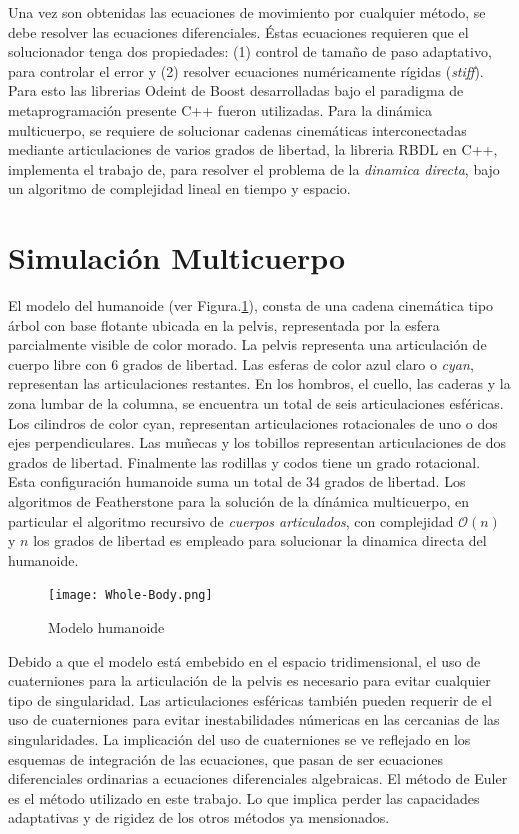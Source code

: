 \documentclass[journal,letterpaper,twoside,twocolumn]{IEEEtran}
\begin{document}
Una vez son obtenidas las ecuaciones de movimiento por cualquier método, se debe resolver las ecuaciones diferenciales. Éstas ecuaciones requieren que el solucionador tenga dos propiedades: (1) control de tamaño de paso adaptativo, para controlar el error y (2) resolver ecuaciones numéricamente rígidas (\emph{stiff}). Para esto las librerias Odeint\cite{Ahnert2011} de Boost desarrolladas bajo el paradigma de metaprogramación presente C++ fueron utilizadas. Para la dinámica multicuerpo, se requiere de solucionar cadenas cinemáticas interconectadas mediante articulaciones de varios grados de libertad, la libreria RBDL\cite{Felis2016} en C++, implementa el trabajo de\cite{Featherstone2008}, para resolver el problema de la \emph{dinamica directa}, bajo un algoritmo de complejidad lineal en tiempo y espacio.

\section{Simulación Multicuerpo}
\label{sec:simula}
El modelo del humanoide (ver Figura.\ref{fig:humModel}), consta de una cadena cinemática tipo árbol con base flotante ubicada en la pelvis, representada por la esfera parcialmente visible de color morado. La pelvis representa una articulación de cuerpo libre con 6 grados de libertad. Las esferas de color azul claro o \emph{cyan}, representan las articulaciones restantes. En los hombros, el cuello, las caderas y la zona lumbar de la columna, se encuentra un total de seis articulaciones esféricas. Los cilindros de color cyan, representan articulaciones rotacionales de uno o dos ejes perpendiculares. Las muñecas y los tobillos representan articulaciones de dos grados de libertad. Finalmente las rodillas y codos tiene un grado rotacional. Esta configuración humanoide suma un total de 34 grados de libertad. Los algoritmos de Featherstone para la solución de la dínámica multicuerpo, en particular el algoritmo recursivo de \emph{cuerpos articulados}, con complejidad $\mathcal{O}(n)$ y $n$ los grados de libertad es empleado para solucionar la dinamica directa del humanoide.
\begin{figure}[!t]
  \centering
  \texttt{[image: Whole-Body.png]}
  \caption{Modelo humanoide}
  \label{fig:humModel}
\end{figure}

Debido a que el modelo está embebido en el espacio tridimensional, el uso de cuaterniones para la articulación de la pelvis es necesario para evitar cualquier tipo de singularidad. Las articulaciones esféricas también pueden requerir de el uso de cuaterniones para evitar inestabilidades númericas en las cercanias de las singularidades. La implicación del uso de cuaterniones se ve reflejado en los esquemas de integración de las ecuaciones, que pasan de ser ecuaciones diferenciales ordinarias a ecuaciones diferenciales algebraicas. El método de Euler es el método utilizado en este trabajo. Lo que implica perder las capacidades adaptativas y de rigidez de los otros métodos ya mensionados.
\end{document}
